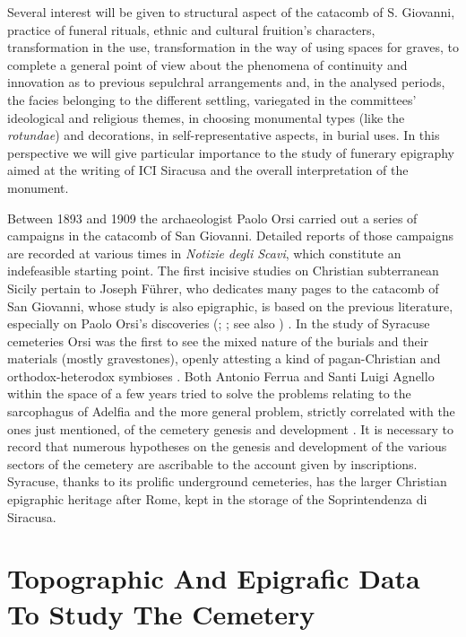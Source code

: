\documentclass[amsthm,ebook]{saparticle}
\begin{document}
Several interest will be given to structural aspect of the catacomb of S. Giovanni, practice of funeral rituals, ethnic and cultural fruition’s characters, transformation in the use, transformation in the way of using spaces for graves, to complete a general point of view about the phenomena of continuity and innovation as to previous sepulchral arrangements and, in the analysed periods, the facies belonging to the different settling, variegated in the committees’ ideological and religious themes, in choosing monumental types (like the \emph{rotundae}) and decorations, in self-representative aspects, in burial uses. In this perspective we will give particular importance to the study of funerary epigraphy aimed at the writing of ICI Siracusa and the overall interpretation of the monument.

Between 1893 and 1909 the archaeologist Paolo Orsi carried out a series of campaigns in the catacomb of San Giovanni. Detailed reports of those campaigns are recorded at various times in \emph{Notizie degli Scavi}, which constitute an indefeasible starting point. The first incisive studies on Christian subterranean Sicily pertain to Joseph Führer, who dedicates many pages to the catacomb of San Giovanni, whose study is also epigraphic, is based on the previous literature, especially on Paolo Orsi’s discoveries (\citealp[13-39]{FUHRER1897}; \citealp[22-26]{FUHRERSCHULTZE1907}; see also \citealp[276, n. 2]{ORSI1893})
. In the study of Syracuse cemeteries Orsi \citep[189]{ORSI1900} was the first to see the mixed nature of the burials and their materials (mostly gravestones), openly attesting a kind of pagan-Christian and orthodox-heterodox symbioses %
. Both Antonio Ferrua and Santi Luigi Agnello within the space of a few years tried to solve the problems relating to the sarcophagus of Adelfia and the more general problem, strictly correlated with the ones just mentioned, of the cemetery genesis and development \citep{FERRUA1952,AGNELLO1956}. It is necessary to record that numerous hypotheses on the genesis and development of the various sectors of the cemetery are ascribable to the account given by inscriptions. Syracuse, thanks to its prolific underground cemeteries, has the larger Christian epigraphic heritage after Rome, kept in the storage of the Soprintendenza di Siracusa.

\section{Topographic And Epigrafic Data To Study The Cemetery}
\end{document}
